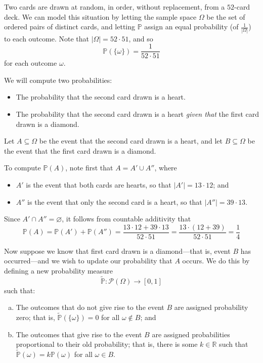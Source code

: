 \begin{example}
\label{exConditionalProbabilityWithCards}
Two cards are drawn at random, in order, without replacement, from a $52$-card deck. We can model this situation by letting the sample space $\Omega$ be the set of ordered pairs of distinct cards, and letting $\mathbb{P}$ assign an equal probability (of $\frac{1}{|\Omega|}$) to each outcome. Note that $|\Omega| = 52 \cdot 51$, and so
\[ \mathbb{P}(\{\omega\}) = \frac{1}{52 \cdot 51} \]
for each outcome $\omega$.

We will compute two probabilities:
\begin{itemize}
\item The probability that the second card drawn is a heart.
\item The probability that the second card drawn is a heart \textit{given that} the first card drawn is a diamond.
\end{itemize}

Let $A \subseteq \Omega$ be the event that the second card drawn is a heart, and let $B \subseteq \Omega$ be the event that the first card drawn is a diamond.

To compute $\mathbb{P}(A)$, note first that $A = A' \cup A''$, where
\begin{itemize}
\item $A'$ is the event that both cards are hearts, so that $|A'| = 13 \cdot 12$; and
\item $A''$ is the event that only the second card is a heart, so that $|A''| = 39 \cdot 13$.
\end{itemize}
Since $A' \cap A'' = \varnothing$, it follows from countable additivity that
\[ \mathbb{P}(A) = \mathbb{P}(A') + \mathbb{P}(A'') = \frac{13 \cdot 12 + 39 \cdot 13}{52 \cdot 51} = \frac{13 \cdot (12 + 39)}{52 \cdot 51} = \frac{1}{4} \]

Now suppose we know that first card drawn is a diamond---that is, event $B$ has occurred---and we wish to update our probability that $A$ occurs. We do this by defining a new probability measure
\[ \widetilde{\mathbb{P}} : \mathcal{P}(\Omega) \to [0,1] \]
such that:
\begin{enumerate}[(a)]
\item The outcomes that do not give rise to the event $B$ are assigned probability zero; that is, $\widetilde{\mathbb{P}}(\{\omega\}) = 0$ for all $\omega \not \in B$; and
\item The outcomes that give rise to the event $B$ are assigned probabilities proportional to their old probability; that is, there is some $k \in \mathbb{R}$ such that $\widetilde{\mathbb{P}}(\omega) = k\mathbb{P}(\omega)$ for all $\omega \in B$.
\end{enumerate}


\end{example}
